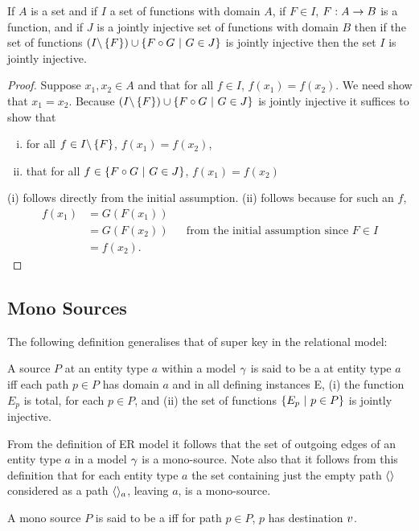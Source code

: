 \begin{lemma}
If $A$ is a set and if $I$  a set of functions with domain $A$, if $F \in I$, $F: A \rightarrow B$ is a function,
and if $J$ is a jointly injective set of functions with domain $B$ then if the set of functions
$(I \backslash \left\{F\right\}) \cup \left\{F \circ G \ \middle|\ G \in J\right\}$ is jointly injective then the
set $I$ is jointly injective.
\end{lemma}
\begin{proof}
Suppose $x_1,x_2 \in A$ and that for all $f \in I$, $f(x_1)=f(x_2)$. We need show that $x_1=x_2$.
Because $(I \backslash \left\{F\right\}) \cup \left\{F \circ G \ \middle|\ G \in J\right\}$ is jointly injective
it suffices to show that 
\begin{enumerate}[(i)]
\item
for all $f \in I \backslash \left\{F\right\}$, $f(x_1)=f(x_2)$, 
\item that for all $f \in \left\{F \circ G \ \middle|\ G \in J\right\}$, $f(x_1)=f(x_2)$
\end{enumerate}
(i) follows directly from the initial assumption. 
(ii) follows because for such an $f$, 
\begin{align*}
f(x_1)&=G(F(x_1)) & & \\
      &=G(F(x_2)) & & \mbox{from the initial assumption since }F \in I \\
			&=f(x_2). & &
\end{align*}
\end{proof}

\subsection{Mono Sources}

The following definition generalises that of super key in the relational model:
\begin{definition}
A source $P$  at an entity type $a$ within a model $\gamma$ is said to be a  at entity type $a$ iff each path $p \in P$ has domain $a$ and  in all defining instances E, 
(i) the function $E_p$ is total, for each $p \in P$, and (ii) the set of functions
$\left\{E_p \ \middle|\ p\in P\right\}$ is jointly injective.
\end{definition}



From the definition of ER model it follows that the set of outgoing edges of an entity type 
$a$ in a model $\gamma$ is a mono-source. Note also that it follows from this definition that for each entity type $a$ the set containing just
the empty path $\langle\rangle$ considered as a path $\langle\rangle_a$, leaving $a$, is a mono-source.  
\begin{definition}
A mono source $P$ is said to be a  iff for path $p \in P$, $p$ has destination $v$.
\end{definition}




